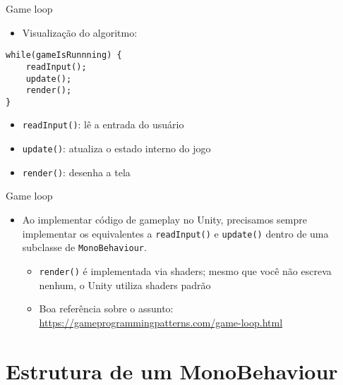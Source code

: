 \documentclass{beamer}
\begin{document}
\begin{frame}[fragile]{Game loop}
	\begin{itemize}
		\item Visualização do algoritmo:
	\end{itemize}		
	\begin{lstlisting}
while(gameIsRunnning) {
	readInput();
	update();
	render();
}
\end{lstlisting}
	\begin{itemize}
		\item \verb|readInput()|: lê a entrada do usuário
		\item \verb|update()|: atualiza o estado interno do jogo
		\item \verb|render()|: desenha a tela
	\end{itemize}
\end{frame}

\begin{frame}[fragile]{Game loop}
%	
	\begin{itemize}
		\item Ao implementar código de gameplay no Unity, precisamos sempre implementar os equivalentes a \verb|readInput()| e \verb|update()| dentro de uma subclasse de \verb|MonoBehaviour|.
		\begin{itemize}
			\item \verb|render()| é implementada via shaders; mesmo que você não escreva nenhum, o Unity utiliza shaders padrão
		\end{itemize}
	\begin{itemize}
		\item Boa referência sobre o assunto: \url{https://gameprogrammingpatterns.com/game-loop.html}
	\end{itemize}
	\end{itemize}
\end{frame}

\section{Estrutura de um MonoBehaviour}
\end{document}

